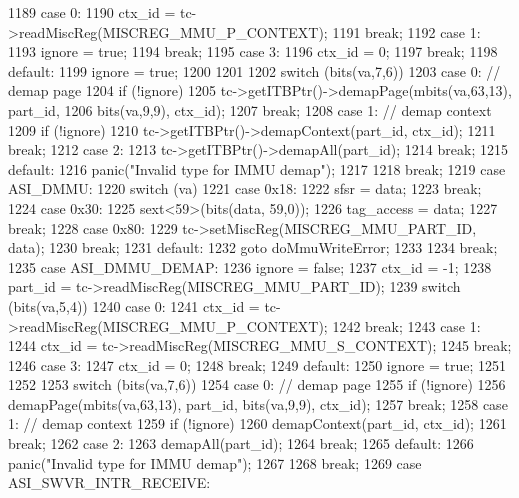 \begin{DoxyCode}
{{{1189           case 0:
1190             ctx_id = tc->readMiscReg(MISCREG_MMU_P_CONTEXT);
1191             break;
1192           case 1:
1193             ignore = true;
1194             break;
1195           case 3:
1196             ctx_id = 0;
1197             break;
1198           default:
1199             ignore = true;
1200         }
1201 
1202         switch (bits(va,7,6)) {
1203           case 0: // demap page
1204             if (!ignore)
1205                 tc->getITBPtr()->demapPage(mbits(va,63,13), part_id,
1206                         bits(va,9,9), ctx_id);
1207             break;
1208           case 1: // demap context
1209             if (!ignore)
1210                 tc->getITBPtr()->demapContext(part_id, ctx_id);
1211             break;
1212           case 2:
1213             tc->getITBPtr()->demapAll(part_id);
1214             break;
1215           default:
1216             panic("Invalid type for IMMU demap\n");
1217         }
1218         break;
1219       case ASI_DMMU:
1220         switch (va) {
1221           case 0x18:
1222             sfsr = data;
1223             break;
1224           case 0x30:
1225             sext<59>(bits(data, 59,0));
1226             tag_access = data;
1227             break;
1228           case 0x80:
1229             tc->setMiscReg(MISCREG_MMU_PART_ID, data);
1230             break;
1231           default:
1232             goto doMmuWriteError;
1233         }
1234         break;
1235       case ASI_DMMU_DEMAP:
1236         ignore = false;
1237         ctx_id = -1;
1238         part_id =  tc->readMiscReg(MISCREG_MMU_PART_ID);
1239         switch (bits(va,5,4)) {
1240           case 0:
1241             ctx_id = tc->readMiscReg(MISCREG_MMU_P_CONTEXT);
1242             break;
1243           case 1:
1244             ctx_id = tc->readMiscReg(MISCREG_MMU_S_CONTEXT);
1245             break;
1246           case 3:
1247             ctx_id = 0;
1248             break;
1249           default:
1250             ignore = true;
1251         }
1252 
1253         switch (bits(va,7,6)) {
1254           case 0: // demap page
1255             if (!ignore)
1256                 demapPage(mbits(va,63,13), part_id, bits(va,9,9), ctx_id);
1257             break;
1258           case 1: // demap context
1259             if (!ignore)
1260                 demapContext(part_id, ctx_id);
1261             break;
1262           case 2:
1263             demapAll(part_id);
1264             break;
1265           default:
1266             panic("Invalid type for IMMU demap\n");
1267         }
1268         break;
1269        case ASI_SWVR_INTR_RECEIVE:
}}
\end{DoxyCode}
